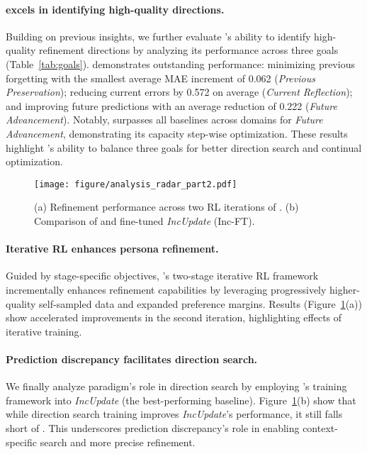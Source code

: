 \paragraph{\method excels in identifying high-quality directions.}
Building on previous insights,
we further evaluate \method’s ability to identify high-quality refinement directions by analyzing its performance across three goals (Table~\ref{tab:goals}). 
\method demonstrates outstanding performance: minimizing previous forgetting with the smallest average MAE increment of 0.062 (\textit{Previous Preservation}); reducing current errors by 0.572 on average (\textit{Current Reflection}); and improving future predictions with an average 
reduction of 0.222 (\textit{Future Advancement}). Notably, \method surpasses all baselines across domains for \textit{Future Advancement}, demonstrating its capacity step-wise optimization. These results highlight \method’s ability to balance three goals for better direction search and continual optimization.


\begin{figure}[t]
    \centering
    \texttt{[image: figure/analysis\_radar\_part2.pdf]}
    \caption{(a) Refinement performance across two RL iterations of \method. (b) Comparison of \method and fine-tuned \textit{IncUpdate} (Inc-FT). }
    \label{fig:analysis_radar_part2}
\end{figure}


\paragraph{Iterative RL enhances persona refinement.}
Guided by stage-specific objectives, \method’s two-stage iterative RL framework incrementally enhances refinement capabilities by leveraging progressively higher-quality self-sampled data and expanded preference margins. Results (Figure~\ref{fig:analysis_radar_part2}(a)) show accelerated improvements in the second iteration, highlighting effects of iterative training.


\paragraph{Prediction discrepancy facilitates direction search.}  
We finally analyze paradigm's role in direction search by employing \method’s training framework into \textit{IncUpdate} (the best-performing baseline). Figure~\ref{fig:analysis_radar_part2}(b) show that while direction search training improves \textit{IncUpdate}’s performance, it still falls short of \method. This underscores prediction discrepancy’s role in enabling context-specific search and more precise refinement.


